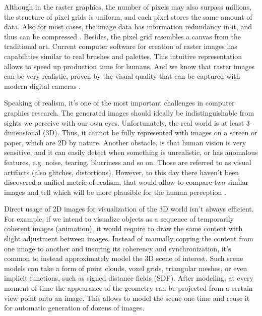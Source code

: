 Although in the raster graphics, the number of pixels may also surpass millions, the structure of pixel grids is uniform, and each pixel stores the same amount of data. Also for most cases, the image data has information redundancy in it, and thus can be compressed \cite{aux:compression18}. Besides, the pixel grid resembles a canvas from the traditional art. Current computer software for creation of raster images has capabilities similar to real brushes and palettes. This intuitive representation allows to speed up production time for humans. And we know that raster images can be very realistic, proven by the visual quality that can be captured with modern digital cameras \cite{aux:camera21}.

Speaking of realism, it's one of the most important challenges in computer graphics research. The generated images should ideally be indistinguishable from sights we perceive with our own eyes. Unfortunately, the real world is at least 3-dimensional (3D). Thus, it cannot be fully represented with images on a screen or paper, which are 2D by nature. Another obstacle, is that human vision is very sensitive, and it can easily detect when something is unrealistic, or has anomalous features, e.g. noise, tearing, blurriness and so on. Those are referred to as visual artifacts (also glitches, distortions). However, to this day there haven't been discovered a unified metric of realism, that would allow to compare two similar images and tell which will be more plausible for the human perception \cite{metric:wang11}.

Direct usage of 2D images for visualization of the 3D world isn't always efficient. For example, if we intend to visualize objects as a sequence of temporarily coherent images (animation), it would require to draw the same content with slight adjustment between images. Instead of manually copying the content from one image to another and insuring its coherency and synchronization, it's common to instead approximately model the 3D scene of interest. Such scene models can take a form of point clouds, voxel grids, triangular meshes, or even implicit functions, such as signed distance fields (SDF). After modeling, at every moment of time the appearance of the geometry can be projected from a certain view point onto an image. This allows to model the scene one time and reuse it for automatic generation of dozens of images.


